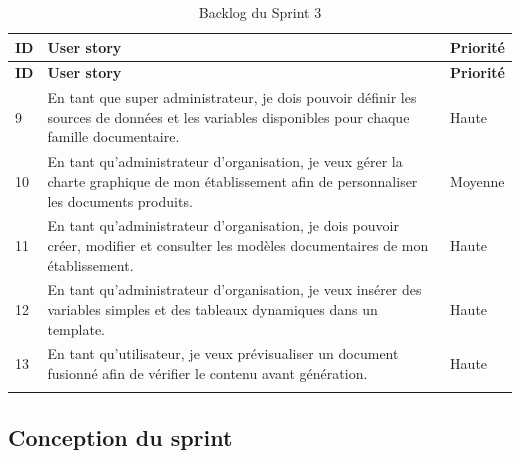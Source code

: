 \begin{longtable}{|>{\centering\arraybackslash}p{1cm}|
                  >{\raggedright\arraybackslash}p{10.4cm}|
                  >{\centering\arraybackslash}p{1.7cm}|}
\hline
\textbf{ID} & \textbf{User story} & \textbf{Priorité} \\
\hline
\endfirsthead

\hline
\textbf{ID} & \textbf{User story} & \textbf{Priorité} \\
\hline
\endhead

9 & En tant que super administrateur, je dois pouvoir définir les sources de données et les variables disponibles pour chaque famille documentaire. & Haute \\
\hline

10 & En tant qu'administrateur d'organisation, je veux gérer la charte graphique de mon établissement afin de personnaliser les documents produits. & Moyenne \\
\hline

11 & En tant qu'administrateur d'organisation, je dois pouvoir créer, modifier et consulter les modèles documentaires de mon établissement. & Haute \\
\hline

12 & En tant qu'administrateur d'organisation, je veux insérer des variables simples et des tableaux dynamiques dans un template. & Haute \\
\hline

13 & En tant qu'utilisateur, je veux prévisualiser un document fusionné afin de vérifier le contenu avant génération. & Haute \\
\hline

\caption{Backlog du Sprint 3}
\label{tab:backlog_sprint3}

\end{longtable}

\subsection{Conception du sprint}

